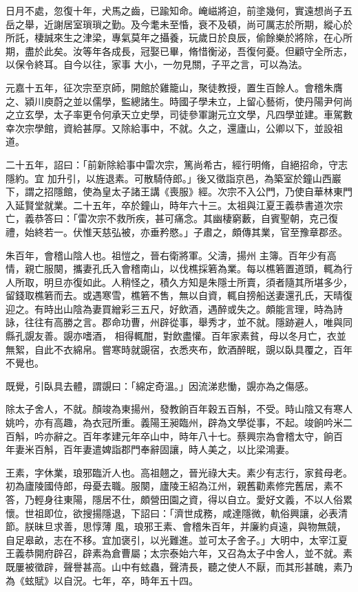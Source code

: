 \begin{pinyinscope}
 日月不處，忽復十年，犬馬之齒，已踰知命。崦嵫將迫，前塗幾何，實遠想尚子五岳之舉，近謝居室瑣瑣之勤。及今耄未至惛，衰不及頓，尚可厲志於所期，縱心於所託，棲誠來生之津梁，專氣莫年之攝養，玩歲日於良辰，偷餘樂於將除，在心所期，盡於此矣。汝等年各成長，冠娶已畢，脩惜衡泌，吾復何憂。但顧守全所志，以保令終耳。自今以往，家事
 大小，一勿見關，子平之言，可以為法。



 元嘉十五年，征次宗至京師，開館於雞籠山，聚徒教授，置生百餘人。會稽朱膺之、潁川庾蔚之並以儒學，監總諸生。時國子學未立，上留心藝術，使丹陽尹何尚之立玄學，太子率更令何承天立史學，司徒參軍謝元立文學，凡四學並建。車駕數幸次宗學館，資給甚厚。又除給事中，不就。久之，還廬山，公卿以下，並設祖道。



 二十五年，詔曰：「前新除給事中雷次宗，篤尚希古，經行明脩，自絕招命，守志隱約。宜
 加升引，以旌退素。可散騎侍郎。」後又徵詣京邑，為築室於鐘山西巖下，謂之招隱館，使為皇太子諸王講《喪服》經。次宗不入公門，乃使自華林東門入延賢堂就業。二十五年，卒於鐘山，時年六十三。太祖與江夏王義恭書道次宗亡，義恭答曰：「雷次宗不救所疾，甚可痛念。其幽棲窮藪，自賓聖朝，克己復禮，始終若一。伏惟天慈弘被，亦垂矜愍。」子肅之，頗傳其業，官至豫章郡丞。



 朱百年，會稽山陰人也。祖愷之，晉右衛將軍。父濤，揚州
 主簿。百年少有高情，親亡服闋，攜妻孔氏入會稽南山，以伐樵採箬為業。每以樵箬置道頭，輒為行人所取，明旦亦復如此。人稍怪之，積久方知是朱隱士所賣，須者隨其所堪多少，留錢取樵箬而去。或遇寒雪，樵箬不售，無以自資，輒自搒船送妻還孔氏，天晴復迎之。有時出山陰為妻買繒彩三五尺，好飲酒，遇醉或失之。頗能言理，時為詩詠，往往有高勝之言。郡命功曹，州辟從事，舉秀才，並不就。隱跡避人，唯與同縣孔覬友善。覬亦嗜酒，
 相得輒酣，對飲盡懽。百年家素貧，母以冬月亡，衣並無絮，自此不衣綿帛。嘗寒時就覬宿，衣悉夾布，飲酒醉眠，覬以臥具覆之，百年不覺也。



 既覺，引臥具去體，謂覬曰：「綿定奇溫。」因流涕悲慟，覬亦為之傷感。



 除太子舍人，不就。顏竣為東揚州，發教餉百年穀五百斛，不受。時山陰又有寒人姚吟，亦有高趣，為衣冠所重。義陽王昶臨州，辟為文學從事，不起。竣餉吟米二百斛，吟亦辭之。百年孝建元年卒山中，時年八十七。蔡興宗為會稽太守，餉百
 年妻米百斛，百年妻遣婢詣郡門奉辭固讓，時人美之，以比梁鴻妻。



 王素，字休業，琅邪臨沂人也。高祖翹之，晉光祿大夫。素少有志行，家貧母老。初為廬陵國侍郎，母憂去職。服闋，廬陵王紹為江州，親舊勸素修完舊居，素不答，乃輕身往東陽，隱居不仕，頗營田園之資，得以自立。愛好文義，不以人俗累懷。世祖即位，欲搜揚隱退，下詔曰：「濟世成務，咸達隱微，軌俗興讓，必表清節。朕昧旦求善，思惇薄
 風，琅邪王素、會稽朱百年，并廉約貞遠，與物無競，自足皋畝，志在不移。宜加褒引，以光難進。並可太子舍子。」大明中，太宰江夏王義恭開府辟召，辟素為倉曹屬；太宗泰始六年，又召為太子中舍人，並不就。素既屢被徵辟，聲譽甚高。山中有蚿蟲，聲清長，聽之使人不厭，而其形甚醜，素乃為《蚿賦》以自況。七年，卒，時年五十四。




\end{pinyinscope}
